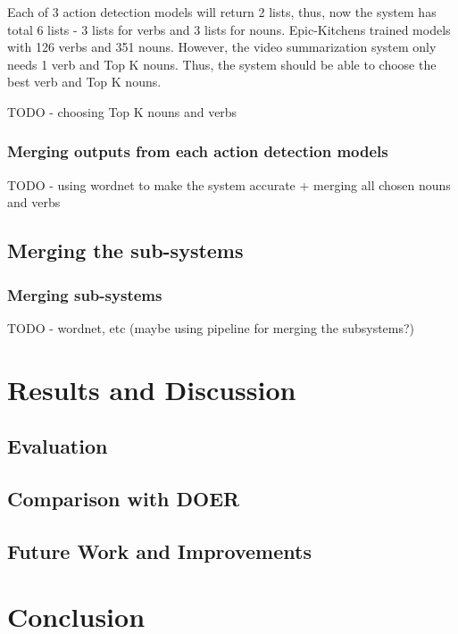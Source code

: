\documentclass{article}
\begin{document}
Each of 3 action detection models will return 2 lists, thus, now the system has total 6 lists - 3 lists for verbs and 3 lists for nouns. Epic-Kitchens trained models with 126 verbs and 351 nouns. However, the video summarization system only needs 1 verb and Top K nouns. Thus, the system should be able to choose the best verb and Top K nouns.

TODO - choosing Top K nouns and verbs

\subsubsection{Merging outputs from each action detection models}

TODO - using wordnet to make the system accurate + merging all chosen nouns and verbs

\subsection{Merging the sub-systems}

\subsubsection{Merging sub-systems}

TODO - wordnet, etc (maybe using pipeline for merging the subsystems?)

\section{Results and Discussion}

\subsection{Evaluation}

\subsection{Comparison with DOER}

\subsection{Future Work and Improvements}

\section{Conclusion}
\end{document}
